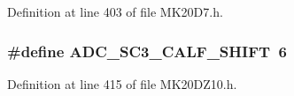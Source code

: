 Definition at line 403 of file M\+K20\+D7.\+h.

\subsubsection[{\texorpdfstring{A\+D\+C\+\_\+\+S\+C3\+\_\+\+C\+A\+L\+F\+\_\+\+S\+H\+I\+FT}{ADC_SC3_CALF_SHIFT}}]{\setlength{\rightskip}{0pt plus 5cm}\#define A\+D\+C\+\_\+\+S\+C3\+\_\+\+C\+A\+L\+F\+\_\+\+S\+H\+I\+FT~6}\hypertarget{group___a_d_c___register___masks_ga9fd60a35fc4c15b563078ecbd3eaa449}{}\label{group___a_d_c___register___masks_ga9fd60a35fc4c15b563078ecbd3eaa449}


Definition at line 415 of file M\+K20\+D\+Z10.\+h.

